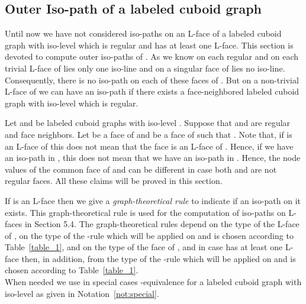 \documentclass[a4paper,11pt]{article}
\begin{document}
\subsection{Outer Iso-path of a labeled cuboid graph}
Until now we have not considered iso-paths on an L-face of a labeled cuboid graph  with
iso-level  which is regular and has at least one L-face. This section is devoted to compute
outer iso-paths of . As we know on each regular and on each trivial L-face of  lies only one iso-line
and on a singular face of  lies no iso-line. Consequently, there is no iso-path on each of these faces
of . But on a non-trivial L-face of  we can have an iso-path if there exists a face-neighbored
labeled cuboid graph  with iso-level  which is regular.

Let  and  be labeled cuboid graphs with iso-level
. Suppose that  and  are regular and face neighbors. Let  be a face of  and  be
a face of  such that . Note that, if  is an L-face of  this does not mean
that the face  is an L-face of . Hence, if we have an iso-path in , this does not mean that
we have an iso-path in . Hence, the node values of the common face of  and  can be different
in case both  and  are not regular faces. All these claims will be proved in this section.

If  is an L-face then we give a {\it graph-theoretical rule} to indicate if an iso-path on it exists.
This graph-theoretical rule is used for the computation of iso-paths on L-faces in Section 5.4. The
graph-theoretical rules depend on the type of the L-face of , on the type of the -rule
which will be applied on  and is chosen according to Table~\ref{table_1}, and on the type of the face
 of , and in case  has at least one L-face then, in addition, from the type of the -rule
which will be applied on  and is chosen according to Table~\ref{table_1}.\\

When needed we use in special cases -equivalence for a labeled cuboid graph
with iso-level  as given in Notation~\ref{not:special}.
\end{document}
